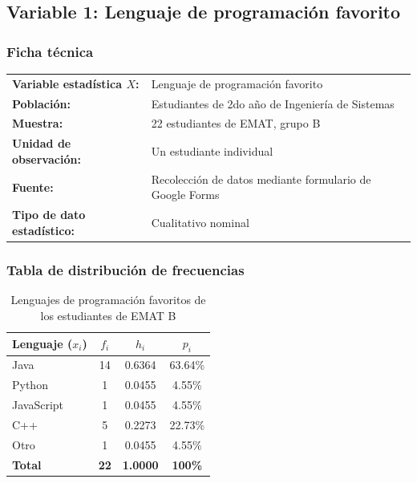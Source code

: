 \documentclass[12pt,letterpaper]{article}
\begin{document}
\subsection{Variable 1: Lenguaje de programación favorito}

\subsubsection{Ficha técnica}

\begin{tabularx}{\textwidth}{@{}l X@{}}
\textbf{Variable estadística $X$:} & Lenguaje de programación favorito \\[4pt]
\textbf{Población:} & Estudiantes de 2do año de Ingeniería de Sistemas \\[4pt]
\textbf{Muestra:} & 22 estudiantes de EMAT, grupo B \\[4pt]
\textbf{Unidad de observación:} & Un estudiante individual \\[4pt]
\textbf{Fuente:} & Recolección de datos mediante formulario de Google Forms \\[4pt]
\textbf{Tipo de dato estadístico:} & Cualitativo nominal \\
\end{tabularx}

\vspace{0.8cm}

\subsubsection{Tabla de distribución de frecuencias}

\begin{table}[H]
    \centering
    \caption{Lenguajes de programación favoritos de los estudiantes de EMAT B}
    \vspace{1em}
    \label{tab:lenguajes-favoritos}
    \begin{tabular}{@{}lccc@{}}
        \toprule
        \textbf{Lenguaje ($x_i$)} & \textbf{$f_i$} & \textbf{$h_i$} & \textbf{$p_i$} \\
        \midrule
        Java        & 14 & 0.6364 & 63.64\% \\
        Python      & 1  & 0.0455 & 4.55\% \\
        JavaScript  & 1  & 0.0455 & 4.55\% \\
        C++         & 5  & 0.2273 & 22.73\% \\
        Otro        & 1  & 0.0455 & 4.55\% \\
        \midrule
        \textbf{Total} & \textbf{22} & \textbf{1.0000} & \textbf{100\%} \\
        \bottomrule
    \end{tabular}
\end{table}
\end{document}
